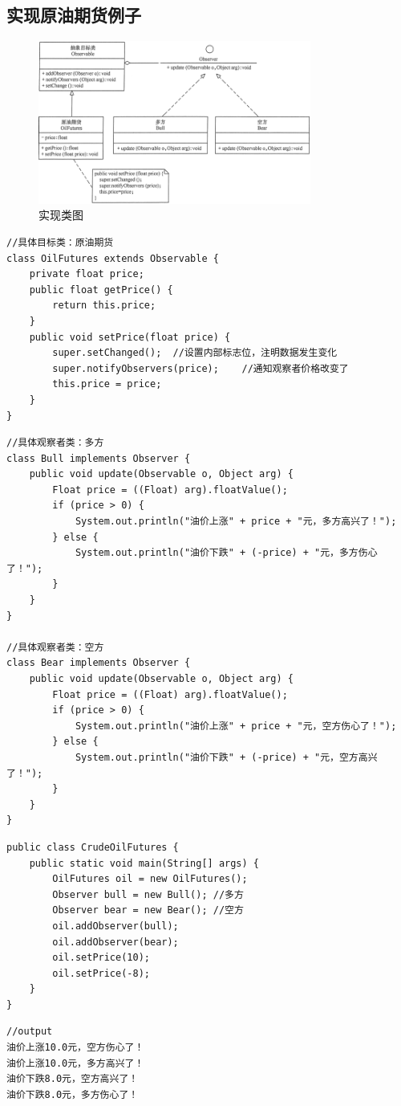 \subsection{实现原油期货例子}
\begin{figure}[!h]
	\centering
	\includegraphics[width=0.8\textwidth]{image/17-3}
	\caption{实现类图}
\end{figure}
\begin{lstlisting}
//具体目标类：原油期货
class OilFutures extends Observable {
	private float price;
	public float getPrice() {
		return this.price;
	}
	public void setPrice(float price) {
		super.setChanged();  //设置内部标志位，注明数据发生变化 
		super.notifyObservers(price);    //通知观察者价格改变了 
		this.price = price;
	}
}
\end{lstlisting}
\begin{lstlisting}
//具体观察者类：多方
class Bull implements Observer {
	public void update(Observable o, Object arg) {
		Float price = ((Float) arg).floatValue();
		if (price > 0) {
			System.out.println("油价上涨" + price + "元，多方高兴了！");
		} else {
			System.out.println("油价下跌" + (-price) + "元，多方伤心了！");
		}
	}
}

//具体观察者类：空方
class Bear implements Observer {
	public void update(Observable o, Object arg) {
		Float price = ((Float) arg).floatValue();
		if (price > 0) {
			System.out.println("油价上涨" + price + "元，空方伤心了！");
		} else {
			System.out.println("油价下跌" + (-price) + "元，空方高兴了！");
		}
	}
}
\end{lstlisting}
\begin{lstlisting}
public class CrudeOilFutures {
	public static void main(String[] args) {
		OilFutures oil = new OilFutures();
		Observer bull = new Bull(); //多方
		Observer bear = new Bear(); //空方
		oil.addObserver(bull);
		oil.addObserver(bear);
		oil.setPrice(10);
		oil.setPrice(-8);
	}
}
\end{lstlisting}
\begin{lstlisting}
//output
油价上涨10.0元，空方伤心了！
油价上涨10.0元，多方高兴了！
油价下跌8.0元，空方高兴了！
油价下跌8.0元，多方伤心了！
\end{lstlisting}
